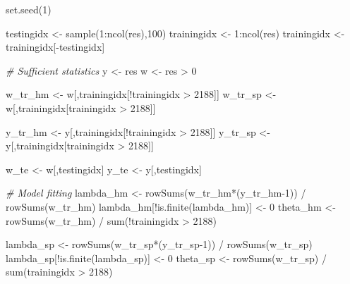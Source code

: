 \documentclass[
]{article}
\newenvironment{Shaded}{\begin{snugshade}}{\end{snugshade}}
\newcommand{\CommentTok}[1]{\textcolor[rgb]{0.56,0.35,0.01}{\textit{#1}}}
\newcommand{\DecValTok}[1]{\textcolor[rgb]{0.00,0.00,0.81}{#1}}
\newcommand{\FunctionTok}[1]{\textcolor[rgb]{0.00,0.00,0.00}{#1}}
\newcommand{\NormalTok}[1]{#1}
\newcommand{\OtherTok}[1]{\textcolor[rgb]{0.56,0.35,0.01}{#1}}
\newcommand{\SpecialCharTok}[1]{\textcolor[rgb]{0.00,0.00,0.00}{#1}}
\begin{document}
\begin{Shaded}
\begin{Highlighting}[]
\FunctionTok{set.seed}\NormalTok{(}\DecValTok{1}\NormalTok{)}

\NormalTok{testingidx }\OtherTok{\textless{}{-}} \FunctionTok{sample}\NormalTok{(}\DecValTok{1}\SpecialCharTok{:}\FunctionTok{ncol}\NormalTok{(res),}\DecValTok{100}\NormalTok{)}
\NormalTok{trainingidx }\OtherTok{\textless{}{-}} \DecValTok{1}\SpecialCharTok{:}\FunctionTok{ncol}\NormalTok{(res)}
\NormalTok{trainingidx }\OtherTok{\textless{}{-}}\NormalTok{ trainingidx[}\SpecialCharTok{{-}}\NormalTok{testingidx]}

\CommentTok{\# Sufficient statistics}
\NormalTok{y }\OtherTok{\textless{}{-}}\NormalTok{ res}
\NormalTok{w }\OtherTok{\textless{}{-}}\NormalTok{ res }\SpecialCharTok{\textgreater{}} \DecValTok{0}

\NormalTok{w\_tr\_hm }\OtherTok{\textless{}{-}}\NormalTok{ w[,trainingidx[}\SpecialCharTok{!}\NormalTok{trainingidx }\SpecialCharTok{\textgreater{}} \DecValTok{2188}\NormalTok{]]}
\NormalTok{w\_tr\_sp }\OtherTok{\textless{}{-}}\NormalTok{ w[,trainingidx[trainingidx }\SpecialCharTok{\textgreater{}} \DecValTok{2188}\NormalTok{]]}

\NormalTok{y\_tr\_hm }\OtherTok{\textless{}{-}}\NormalTok{ y[,trainingidx[}\SpecialCharTok{!}\NormalTok{trainingidx }\SpecialCharTok{\textgreater{}} \DecValTok{2188}\NormalTok{]]}
\NormalTok{y\_tr\_sp }\OtherTok{\textless{}{-}}\NormalTok{ y[,trainingidx[trainingidx }\SpecialCharTok{\textgreater{}} \DecValTok{2188}\NormalTok{]]}
             
\NormalTok{w\_te }\OtherTok{\textless{}{-}}\NormalTok{ w[,testingidx]}
\NormalTok{y\_te }\OtherTok{\textless{}{-}}\NormalTok{ y[,testingidx]}

\CommentTok{\# Model fitting}
\NormalTok{lambda\_hm }\OtherTok{\textless{}{-}} \FunctionTok{rowSums}\NormalTok{(w\_tr\_hm}\SpecialCharTok{*}\NormalTok{(y\_tr\_hm}\DecValTok{{-}1}\NormalTok{)) }\SpecialCharTok{/} \FunctionTok{rowSums}\NormalTok{(w\_tr\_hm)}
\NormalTok{lambda\_hm[}\SpecialCharTok{!}\FunctionTok{is.finite}\NormalTok{(lambda\_hm)] }\OtherTok{\textless{}{-}} \DecValTok{0}
\NormalTok{theta\_hm }\OtherTok{\textless{}{-}} \FunctionTok{rowSums}\NormalTok{(w\_tr\_hm) }\SpecialCharTok{/} \FunctionTok{sum}\NormalTok{(}\SpecialCharTok{!}\NormalTok{trainingidx }\SpecialCharTok{\textgreater{}} \DecValTok{2188}\NormalTok{)}

\NormalTok{lambda\_sp }\OtherTok{\textless{}{-}} \FunctionTok{rowSums}\NormalTok{(w\_tr\_sp}\SpecialCharTok{*}\NormalTok{(y\_tr\_sp}\DecValTok{{-}1}\NormalTok{)) }\SpecialCharTok{/} \FunctionTok{rowSums}\NormalTok{(w\_tr\_sp)}
\NormalTok{lambda\_sp[}\SpecialCharTok{!}\FunctionTok{is.finite}\NormalTok{(lambda\_sp)] }\OtherTok{\textless{}{-}} \DecValTok{0}
\NormalTok{theta\_sp }\OtherTok{\textless{}{-}} \FunctionTok{rowSums}\NormalTok{(w\_tr\_sp) }\SpecialCharTok{/} \FunctionTok{sum}\NormalTok{(trainingidx }\SpecialCharTok{\textgreater{}} \DecValTok{2188}\NormalTok{)}


\end{Highlighting}
\end{Shaded}
\end{document}
